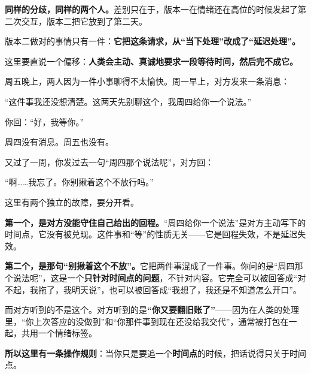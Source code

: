 \textbf{同样的分歧，同样的两个人。}差别只在于，版本一在情绪还在高位的时候发起了第二次交互，版本二把它放到了第二天。

版本二做对的事情只有一件：\textbf{它把这条请求，从“当下处理”改成了“延迟处理”。}

这里要直说一个偏移：\textbf{人类会主动、真诚地要求一段等待时间，然后完不成它。}

\begin{mdquote}


\vspace{0.3\baselineskip}

周五晚上，两人因为一件小事聊得不太愉快。周一早上，对方发来一条消息：

\vspace{0.3\baselineskip}

“这件事我还没想清楚。这两天先别聊这个，我周四给你一个说法。”

\vspace{0.3\baselineskip}

你回：“好，我等你。”

\vspace{0.3\baselineskip}

周四没有消息。周五也没有。

\vspace{0.3\baselineskip}

又过了一周，你发过去一句“周四那个说法呢”，对方回：

\vspace{0.3\baselineskip}

“啊……我忘了。你别揪着这个不放行吗。”
\end{mdquote}

这里有两个独立的故障，要分开看。

\textbf{第一个，是对方没能守住自己给出的回程。}“周四给你一个说法”是对方主动写下的时间点，它没有被兑现。这件事和“等”的性质无关——它是回程失效，不是延迟失效。

\textbf{第二个，是那句“别揪着这个不放”。}它把两件事混成了一件事。你问的是“周四那个说法呢”，这是一个\textbf{只针对时间点的问题}，不针对内容。它完全可以被回答成“对不起，我拖了，我明天说”，也可以被回答成“我想了，我还是不知道怎么开口”。

而对方听到的不是这个。对方听到的是\textbf{“你又要翻旧账了”}——因为在人类的处理里，“你上次答应的没做到”和“你那件事到现在还没给我交代”，通常被打包在一起，共用一个情绪标签。

\textbf{所以这里有一条操作规则}：当你只是要追一个\textbf{时间点}的时候，把话说得只关于时间点。

